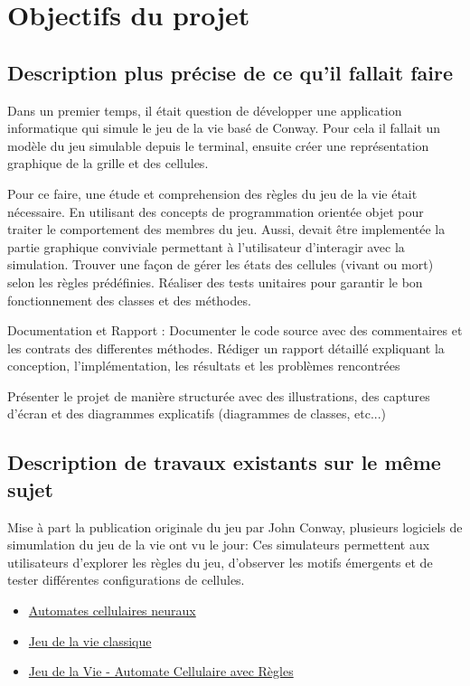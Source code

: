 \section{Objectifs du projet}
\label{ch:lit_rev} 

\subsection{Description plus précise de ce qu'il fallait faire} 

Dans un premier temps, il était question de développer une application informatique qui simule le jeu de la vie basé de Conway.
Pour cela il fallait un modèle du jeu simulable depuis le terminal, ensuite créer une représentation graphique de la grille et des cellules.

Pour ce faire, une étude et comprehension des règles du jeu de la vie était nécessaire.
En utilisant des concepts de programmation orientée objet pour traiter le comportement des membres du jeu. Aussi, devait être implementée la partie graphique conviviale permettant à l'utilisateur d'interagir avec la simulation.
Trouver une façon de gérer les états des cellules (vivant ou mort) selon les règles prédéfinies.
Réaliser des tests unitaires pour garantir le bon fonctionnement des classes et des méthodes.

Documentation et Rapport : Documenter le code source avec des commentaires et les contrats des differentes méthodes.
Rédiger un rapport détaillé expliquant la conception, l'implémentation, les résultats et les problèmes rencontrées

Présenter le projet de manière structurée avec des illustrations, des captures d'écran et des diagrammes explicatifs (diagrammes de classes, etc...)

\subsection{Description de travaux existants sur le même sujet}

Mise à part la publication originale du jeu par John Conway, plusieurs logiciels de simumlation du jeu de la vie ont vu le jour: 
Ces simulateurs permettent aux utilisateurs d'explorer les règles du jeu, d'observer les motifs émergents et de tester différentes configurations de cellules.
\begin{itemize}
    \item \href{https://neuralpatterns.io/}{Automates cellulaires neuraux}
    \item \href{https://www.geekpassion.fr/jeu-de-la-vie}{Jeu de la vie classique}
    \item \href{https://www.dcode.fr/jeu-de-la-vie}{Jeu de la Vie - Automate Cellulaire avec Règles} 

\end{itemize}

